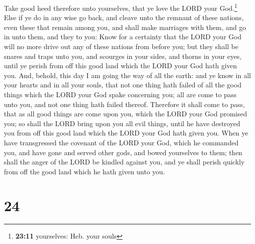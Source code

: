  Take good heed therefore unto yourselves, that ye love
the LORD your God.\footnote{\textbf{23:11} yourselves: Heb. your souls}
 Else if ye do in any wise go back, and cleave unto the
remnant of these nations, even these that remain among you, and shall
make marriages with them, and go in unto them, and they to you:
 Know for a certainty that the LORD your God will no more
drive out any of these nations from before you; but they shall be snares
and traps unto you, and scourges in your sides, and thorns in your eyes,
until ye perish from off this good land which the LORD your God hath
given you.  And, behold, this day I am going the way of
all the earth: and ye know in all your hearts and in all your souls,
that not one thing hath failed of all the good things which the LORD
your God spake concerning you; all are come to pass unto you, and not
one thing hath failed thereof.  Therefore it shall come
to pass, that as all good things are come upon you, which the LORD your
God promised you; so shall the LORD bring upon you all evil things,
until he have destroyed you from off this good land which the LORD your
God hath given you.  When ye have transgressed the
covenant of the LORD your God, which he commanded you, and have gone and
served other gods, and bowed yourselves to them; then shall the anger of
the LORD be kindled against you, and ye shall perish quickly from off
the good land which he hath given unto you.

\hypertarget{section-23}{%
\section{24}\label{section-23}}

